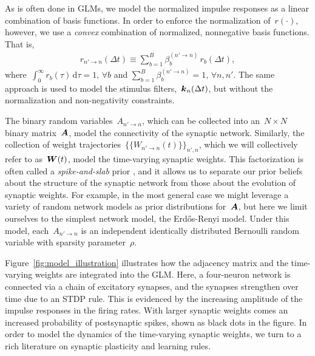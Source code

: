 As is often done in GLMs, we model the normalized impulse responses as a linear combination of basis functions. In order to enforce the normalization of~$r(\cdot)$, however, we use a \emph{convex} combination of normalized, nonnegative basis functions. That is,
\begin{align*}
r_{n' \to n}(\Delta t) \equiv \sum_{b=1}^B \beta^{(n' \to n)}_{b}\, r_b(\Delta t),
\end{align*}
where~${\int_0^\infty r_b(\tau)\,\mathrm{d} \tau = 1,\,\forall b}$ and ${\sum_{b=1}^B \beta^{(n' \to n)}_{b} = 1,\,\forall n,n'}$. The same approach is used to model the stimulus filters,~$\boldsymbol{k}_n(\Delta t)$, but without the normalization and non-negativity constraints.

The binary random variables~$A_{n' \to n}$, which can be collected into an~${N\times N}$ binary matrix~$\boldsymbol{A}$, model the connectivity of the synaptic network. Similarly, the collection of weight trajectories~${\{\{W_{n' \to n}(t)\}\}_{n',n}}$, which we will collectively refer to as~$\boldsymbol{W}(t)$, model the time-varying synaptic weights. This factorization is often called a \emph{spike-and-slab} prior \cite{Mitchell1988}, and it allows us to separate our prior beliefs about the structure of the synaptic network from those about the evolution of synaptic weights. For example, in the most general case we might leverage a variety of random network models \cite{Lloyd-2012} as prior distributions for~$\boldsymbol{A}$, but here we limit ourselves to the simplest network model, the Erd\H{o}s-Renyi model. Under this model, each~$A_{n' \to n}$ is an independent identically distributed Bernoulli random variable with sparsity parameter~$\rho$. 

Figure~\ref{fig:model_illustration} illustrates how the adjacency matrix and the time-varying weights are integrated into the GLM. Here, a four-neuron network is connected via a chain of excitatory synapses, and the synapses strengthen over time due to an STDP rule. This is evidenced by the increasing amplitude of the impulse responses in the firing rates.  With larger synaptic weights comes an increased probability of postsynaptic spikes, shown as black dots in the figure. In order to model the dynamics of the time-varying synaptic weights, we turn to a rich literature on synaptic plasticity and learning rules. 

